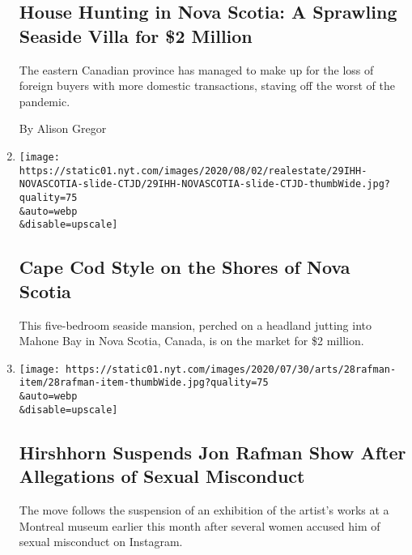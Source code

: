 \begin{enumerate}
  \hypertarget{house-hunting-in-nova-scotia-a-sprawling-seaside-villa-for-2-million}{%
  \subsection{House Hunting in Nova Scotia: A Sprawling Seaside Villa
  for \$2
  Million}\label{house-hunting-in-nova-scotia-a-sprawling-seaside-villa-for-2-million}}

  The eastern Canadian province has managed to make up for the loss of
  foreign buyers with more domestic transactions, staving off the worst
  of the pandemic.

  By Alison Gregor
\item
  \href{/slideshow/2020/07/29/realestate/cape-cod-style-on-the-shores-of-nova-scotia.html}{}

  \texttt{[image: https://static01.nyt.com/images/2020/08/02/realestate/29IHH-NOVASCOTIA-slide-CTJD/29IHH-NOVASCOTIA-slide-CTJD-thumbWide.jpg?quality=75\\\&auto=webp\\\&disable=upscale]}

  \hypertarget{cape-cod-style-on-the-shores-of-nova-scotia}{%
  \subsection{Cape Cod Style on the Shores of Nova
  Scotia}\label{cape-cod-style-on-the-shores-of-nova-scotia}}

  This five-bedroom seaside mansion, perched on a headland jutting into
  Mahone Bay in Nova Scotia, Canada, is on the market for \$2 million.
\item
  \href{/2020/07/28/arts/design/hirshhorn-museum-jon-rafman.html}{}

  \texttt{[image: https://static01.nyt.com/images/2020/07/30/arts/28rafman-item/28rafman-item-thumbWide.jpg?quality=75\\\&auto=webp\\\&disable=upscale]}

  \hypertarget{hirshhorn-suspends-jon-rafman-show-after-allegations-of-sexual-misconduct}{%
  \subsection{Hirshhorn Suspends Jon Rafman Show After Allegations of
  Sexual
  Misconduct}\label{hirshhorn-suspends-jon-rafman-show-after-allegations-of-sexual-misconduct}}

  The move follows the suspension of an exhibition of the artist's works
  at a Montreal museum earlier this month after several women accused
  him of sexual misconduct on Instagram.


\end{enumerate}
